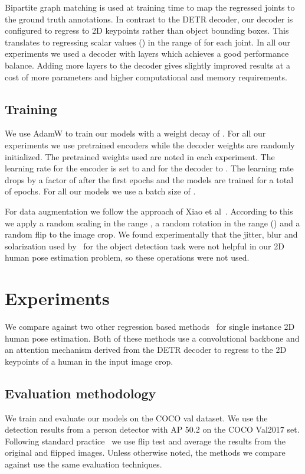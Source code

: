 \documentclass[runningheads]{llncs}
\begin{document}
Bipartite graph matching is used at training time  to map the regressed joints to the 
ground truth annotations. In contrast to the DETR decoder, our decoder is 
configured to regress to 2D keypoints rather than object bounding boxes. 
This translates to regressing  scalar values () in the range of  for each joint. In all our experiments we used a decoder with  layers which achieves a good performance balance. Adding more layers to the decoder gives slightly improved results at a cost of more parameters and higher computational and memory requirements. 


\subsection{Training}
\label{sec:training}
We use AdamW to train our models with a weight decay of . For all our experiments we use pretrained encoders while the decoder weights are randomly initialized. The pretrained weights used are noted in each experiment. The learning rate for the encoder is set to  and for the decoder to . The learning rate drops by a factor of  after the first  epochs and 
the models are trained for a total of  epochs. For all our models we use a 
batch size of .

For data augmentation we follow the approach of Xiao et al~\cite{xiao2018simple}. According to this we apply a random scaling in the range , a random rotation in the range () and a random flip to the image crop. We  found experimentally that the jitter, blur and solarization used by~\cite{carion2020end} for the object detection task were not helpful in our 2D human pose estimation problem, so these operations were not used.

\section{Experiments}
\label{sec:experiments}
We compare against two other regression based methods~\cite{li2021pose,mao2021tfpose} for 
single instance 2D human pose estimation. Both of these methods use a convolutional backbone 
and an attention mechanism derived from the DETR decoder to regress to the 
2D keypoints of a human in the input image crop.

\subsection{Evaluation methodology}
We train and evaluate our models on the COCO val dataset. We use the detection results from a person detector with AP 50.2 on the COCO Val2017 set. Following standard practice~\cite{xiao2018simple,li2021pose} we use flip test and average the results from the original and flipped images. Unless otherwise noted, the methods we compare against use the same evaluation techniques.
\end{document}
